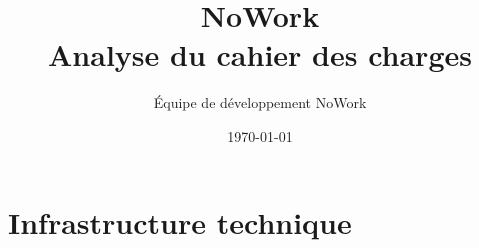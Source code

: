 \documentclass[12pt,a4paper]{article}
\title{NoWork\\
Analyse du cahier des charges}
\author{Équipe de développement NoWork\\[2em]}
\date\today
\begin{document}
\maketitle

\section{Infrastructure technique}
\end{document}

